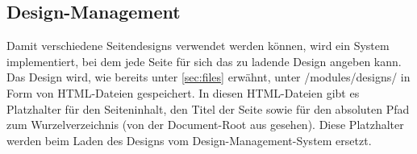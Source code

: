 \subsection{Design-Management}
Damit verschiedene Seitendesigns verwendet werden können, wird ein System implementiert, bei dem jede Seite für sich das zu ladende Design angeben kann. Das Design wird, wie bereits unter \autoref{sec:files} erwähnt, unter /modules/designs/ in Form von HTML-Dateien gespeichert. In diesen HTML-Dateien gibt es Platzhalter für den Seiteninhalt, den Titel der Seite sowie für den absoluten Pfad zum Wurzelverzeichnis (von der Document-Root aus gesehen). Diese Platzhalter werden beim Laden des Designs vom Design-Management-System ersetzt.